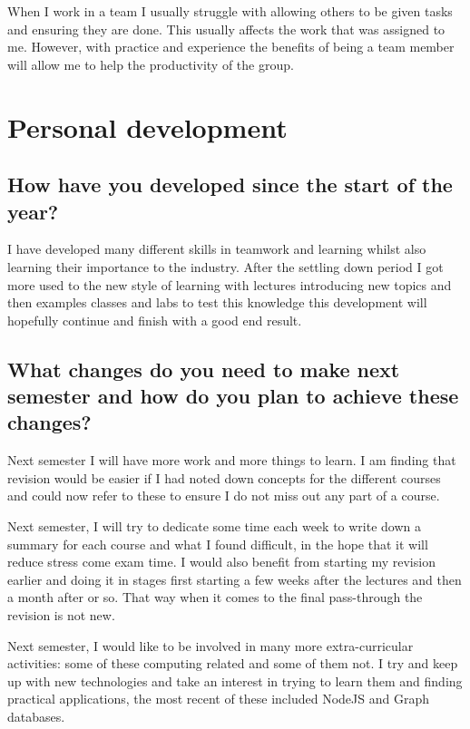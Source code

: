 \documentclass[12pt]{article}
\begin{document}
      When I work in a team I usually struggle with allowing others to be given
      tasks and ensuring they are done. This usually affects the work that was
      assigned to me. However, with practice and experience the benefits of 
      being a team member will allow me to help the productivity of the group.
  \section{Personal development}
    \subsection{How have you developed since the start of the year?}
      I have developed many different skills in teamwork and learning whilst
      also learning their importance to the industry. After the settling down
      period I got more used to the new style of learning with lectures
      introducing new topics and then examples classes and labs to test this
      knowledge this development will hopefully continue and finish with a good
      end result.
    \subsection{What changes do you need to make next semester and how do
      you plan to achieve these changes?}
      Next semester I will have more work and more things to learn. I am finding
      that revision would be easier if I had noted down concepts for the 
      different courses and could now refer to these to ensure I do not miss out
      any part of a course.
      
      Next semester, I will try to dedicate some time each week to write down a 
      summary for each course and what I found difficult, in the hope
      that it will reduce stress come exam time. I would also benefit from
      starting my revision earlier and doing it in stages first starting a few
      weeks after the lectures and then a month after or so. That way when it
      comes to the final pass-through the revision is not new.

      Next semester, I would like to be involved in many more extra-curricular 
      activities: some of these computing related and some of them not. I try
      and keep up with new technologies and take an interest in trying to learn
      them and finding practical applications, the most recent of these included 
      NodeJS and Graph databases.
\end{document}
